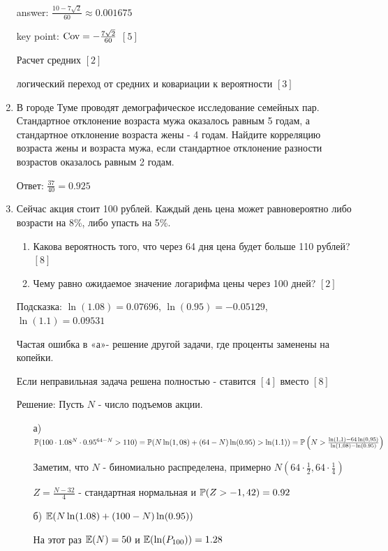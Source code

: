 \documentclass[12pt, a4paper]{article}\usepackage[]{graphicx}\usepackage[]{color}
\begin{document}
\begin{enumerate}
answer: $\frac{10-7\sqrt{2}}{60}\approx 0.001675$

key point: $\Cov=-\frac{7\sqrt{2}}{60}$ $[5]$

Расчет средних $[2]$

логический переход от средних и ковариации к вероятности $[3]$

\item В городе Туме проводят демографическое исследование семейных пар. Стандартное отклонение возраста мужа оказалось равным 5 годам, а стандартное отклонение возраста жены - 4 годам. Найдите корреляцию возраста жены и возраста мужа, если стандартное отклонение разности возрастов оказалось равным 2 годам.

Ответ: $\frac{37}{40}=0.925$

\item Сейчас акция стоит 100 рублей. Каждый день цена может равновероятно либо возрасти на 8\%, либо упасть на 5\%.
\begin{enumerate}
\item Какова вероятность того, что через 64 дня цена будет больше 110 рублей? $[8]$
\item Чему равно ожидаемое значение логарифма цены через 100 дней? $[2]$
\end{enumerate}
Подсказка: $\ln(1.08)=0.07696$, $\ln(0.95)=-0.05129$, $\ln(1.1)=0.09531$

Частая ошибка в «а»- решение другой задачи, где проценты заменены на копейки.

Если неправильная задача решена полностью - ставится $[4]$ вместо $[8]$

Решение:
Пусть $N$ - число подъемов акции.
\begin{enumerate}
\item[а)] $\P(100\cdot 1.08^N\cdot 0.95^{64-N}>110)= \P(N \ln(1,08)+(64-N) \ln(0.95)> \ln(1.1))=\\
\P\left(N>\frac{\ln(1,1)-64\ln(0,95)}{\ln(1,08)-\ln(0.95)}\right)$

Заметим, что $N$ - биномиально распределена, примерно $N(64\cdot\frac{1}{2},64\cdot\frac{1}{4})$

$Z=\frac{N-32}{4}$ - стандартная нормальная и $\P(Z>-1,42)=0.92$
\item[б)] $\E(N\ln(1.08)+(100-N)\ln(0.95))$

На этот раз $\E(N)=50$ и $\E(\ln(P_{100}))=1.28$
\end{enumerate}


\end{enumerate}
\end{document}
